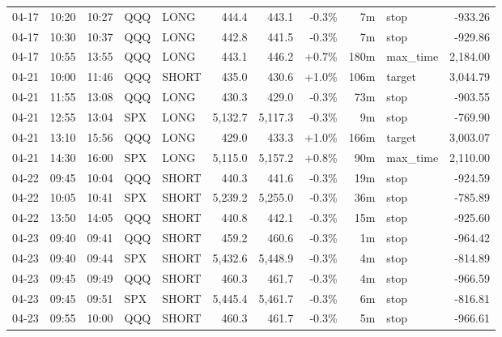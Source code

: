 \documentclass[11pt,a4paper,twoside]{article}
\begin{document}
\begin{center}
\begin{longtable}{>{\color{txtmain}}l l l l l r r r r >{\color{txtmain}}l r}
04-17 & 10:20 & 10:27 & QQQ & LONG & 444.4 & 443.1 & \textcolor{lossred}{-0.3\%} & 7m & stop & \textcolor{lossred}{-933.26} \\
04-17 & 10:30 & 10:37 & QQQ & LONG & 442.8 & 441.5 & \textcolor{lossred}{-0.3\%} & 7m & stop & \textcolor{lossred}{-929.86} \\
04-17 & 10:55 & 13:55 & QQQ & LONG & 443.1 & 446.2 & \textcolor{wingreen}{+0.7\%} & 180m & max\_time & \textcolor{wingreen}{2,184.00} \\
04-21 & 10:00 & 11:46 & QQQ & SHORT & 435.0 & 430.6 & \textcolor{wingreen}{+1.0\%} & 106m & target & \textcolor{wingreen}{3,044.79} \\
04-21 & 11:55 & 13:08 & QQQ & LONG & 430.3 & 429.0 & \textcolor{lossred}{-0.3\%} & 73m & stop & \textcolor{lossred}{-903.55} \\
04-21 & 12:55 & 13:04 & SPX & LONG & 5,132.7 & 5,117.3 & \textcolor{lossred}{-0.3\%} & 9m & stop & \textcolor{lossred}{-769.90} \\
04-21 & 13:10 & 15:56 & QQQ & LONG & 429.0 & 433.3 & \textcolor{wingreen}{+1.0\%} & 166m & target & \textcolor{wingreen}{3,003.07} \\
04-21 & 14:30 & 16:00 & SPX & LONG & 5,115.0 & 5,157.2 & \textcolor{wingreen}{+0.8\%} & 90m & max\_time & \textcolor{wingreen}{2,110.00} \\
04-22 & 09:45 & 10:04 & QQQ & SHORT & 440.3 & 441.6 & \textcolor{lossred}{-0.3\%} & 19m & stop & \textcolor{lossred}{-924.59} \\
04-22 & 10:05 & 10:41 & SPX & SHORT & 5,239.2 & 5,255.0 & \textcolor{lossred}{-0.3\%} & 36m & stop & \textcolor{lossred}{-785.89} \\
04-22 & 13:50 & 14:05 & QQQ & SHORT & 440.8 & 442.1 & \textcolor{lossred}{-0.3\%} & 15m & stop & \textcolor{lossred}{-925.60} \\
04-23 & 09:40 & 09:41 & QQQ & SHORT & 459.2 & 460.6 & \textcolor{lossred}{-0.3\%} & 1m & stop & \textcolor{lossred}{-964.42} \\
04-23 & 09:40 & 09:44 & SPX & SHORT & 5,432.6 & 5,448.9 & \textcolor{lossred}{-0.3\%} & 4m & stop & \textcolor{lossred}{-814.89} \\
04-23 & 09:45 & 09:49 & QQQ & SHORT & 460.3 & 461.7 & \textcolor{lossred}{-0.3\%} & 4m & stop & \textcolor{lossred}{-966.59} \\
04-23 & 09:45 & 09:51 & SPX & SHORT & 5,445.4 & 5,461.7 & \textcolor{lossred}{-0.3\%} & 6m & stop & \textcolor{lossred}{-816.81} \\
04-23 & 09:55 & 10:00 & QQQ & SHORT & 460.3 & 461.7 & \textcolor{lossred}{-0.3\%} & 5m & stop & \textcolor{lossred}{-966.61} \\

\end{longtable}
\end{center}
\end{document}
